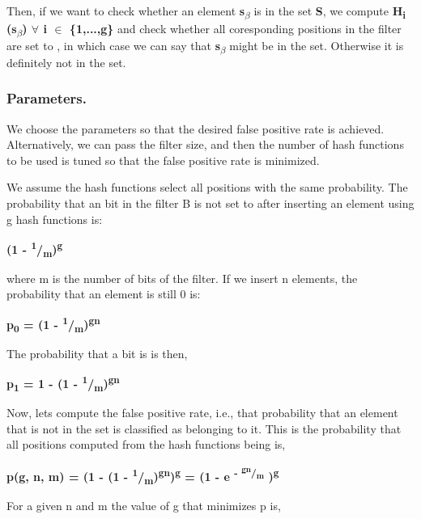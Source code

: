 Then, if we want to check whether an element {\bfseries s\textsubscript{{$\beta$}}} is in the set {\bfseries S}, we compute {\bfseries H\textsubscript{i} (s\textsubscript{{$\beta$}}) {$\forall$} i {$\in$} \{1,...,g\}} and check whether all coresponding positions in the filter are set to {}, in which case we can say that {\bfseries s\textsubscript{{$\beta$}}} might be in the set. Otherwise it is definitely not in the set.

\subsubsection*{Parameters.}

We choose the parameters so that the desired false positive rate is achieved. Alternatively, we can pass the filter size, and then the number of hash functions to be used is tuned so that the false positive rate is minimized.

We assume the hash functions select all positions with the same probability. The probability that an bit in the filter {\ttfamily B} is not set to {} after inserting an element using {\ttfamily g} hash functions is\+:

{\bfseries  (1 -\/ \textsuperscript{1}/\textsubscript{m})\textsuperscript{g} }

where {\ttfamily m} is the number of bits of the filter. If we insert {\ttfamily n} elements, the probability that an element is still 0 is\+:

{\bfseries  p\textsubscript{0} = (1 -\/ \textsuperscript{1}/\textsubscript{m})\textsuperscript{gn} }

The probability that a bit is {} is then,

{\bfseries  p\textsubscript{1} = 1 -\/ (1 -\/ \textsuperscript{1}/\textsubscript{m})\textsuperscript{gn} }

Now, let\textquotesingle{}s compute the false positive rate, i.\+e., that probability that an element that is not in the set is classified as belonging to it. This is the probability that all positions computed from the hash functions being {} is,

{\bfseries  p(g, n, m) = (1 -\/ (1 -\/ \textsuperscript{1}/\textsubscript{m})\textsuperscript{gn})\textsuperscript{g} = (1 -\/ e\textsuperscript{ -\/ \textsuperscript{gn}/\textsubscript{m} })\textsuperscript{g} }

For a given {\ttfamily n} and {\ttfamily m} the value of {\ttfamily g} that minimizes {\ttfamily p} is,

